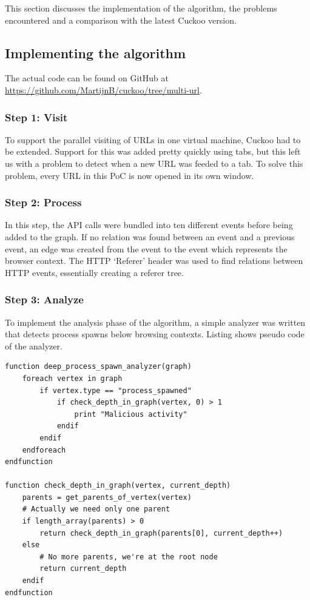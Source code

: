 This section discusses the implementation of the algorithm, the problems encountered and a comparison with the latest Cuckoo version.

\subsection{Implementing the algorithm}

The actual code can be found on GitHub at \url{https://github.com/MartijnB/cuckoo/tree/multi-url}.

\subsubsection{Step 1: Visit}

To support the parallel visiting of URLs in one virtual machine, Cuckoo had to be extended. Support for this was added pretty quickly using tabs, but this left us with a problem to detect when a new URL was feeded to a tab. To solve this problem, every URL in this PoC is now opened in its own window.

\subsubsection{Step 2: Process}

In this step, the API calls were bundled into ten different events before being added to the graph. If no relation was found between an event and a previous event, an edge was created from the event to the event which represents the browser context. The HTTP `Referer' header was used to find relations between HTTP events, essentially creating a referer tree.\cite{http://pdf.aminer.org/000/654/566/analysis_of_user_web_traffic_with_a_focus_on_search.pdf} 

\subsubsection{Step 3: Analyze}

To implement the analysis phase of the algorithm, a simple analyzer was written that detects process spawns below browsing contexts. Listing  shows pseudo code of the analyzer.

\begin{lstlisting}
function deep_process_spawn_analyzer(graph)
    foreach vertex in graph
        if vertex.type == "process_spawned"
            if check_depth_in_graph(vertex, 0) > 1
                print "Malicious activity"
            endif
        endif
    endforeach
endfunction

function check_depth_in_graph(vertex, current_depth)
    parents = get_parents_of_vertex(vertex)
    # Actually we need only one parent
    if length_array(parents) > 0
        return check_depth_in_graph(parents[0], current_depth++)
    else
        # No more parents, we're at the root node
        return current_depth
    endif
endfunction
\end{lstlisting}

